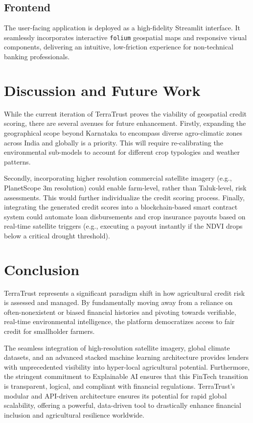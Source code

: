 \documentclass[conference]{IEEEtran}
\begin{document}
\subsection{Frontend}
The user-facing application is deployed as a high-fidelity Streamlit interface. It seamlessly incorporates interactive \texttt{folium} geospatial maps and responsive visual components, delivering an intuitive, low-friction experience for non-technical banking professionals.

\section{Discussion and Future Work}
While the current iteration of TerraTrust proves the viability of geospatial credit scoring, there are several avenues for future enhancement. 
Firstly, expanding the geographical scope beyond Karnataka to encompass diverse agro-climatic zones across India and globally is a priority. This will require re-calibrating the environmental sub-models to account for different crop typologies and weather patterns.

Secondly, incorporating higher resolution commercial satellite imagery (e.g., PlanetScope 3m resolution) could enable farm-level, rather than Taluk-level, risk assessments. This would further individualize the credit scoring process. Finally, integrating the generated credit scores into a blockchain-based smart contract system could automate loan disbursements and crop insurance payouts based on real-time satellite triggers (e.g., executing a payout instantly if the NDVI drops below a critical drought threshold).

\section{Conclusion}
TerraTrust represents a significant paradigm shift in how agricultural credit risk is assessed and managed. By fundamentally moving away from a reliance on often-nonexistent or biased financial histories and pivoting towards verifiable, real-time environmental intelligence, the platform democratizes access to fair credit for smallholder farmers. 

The seamless integration of high-resolution satellite imagery, global climate datasets, and an advanced stacked machine learning architecture provides lenders with unprecedented visibility into hyper-local agricultural potential. Furthermore, the stringent commitment to Explainable AI ensures that this FinTech transition is transparent, logical, and compliant with financial regulations. TerraTrust's modular and API-driven architecture ensures its potential for rapid global scalability, offering a powerful, data-driven tool to drastically enhance financial inclusion and agricultural resilience worldwide.
\end{document}
